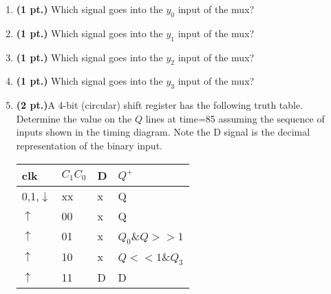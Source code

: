 \documentclass{article}
\begin{document}
\begin{enumerate}
\begin{tabular}{lr}

\begin{tabular}[!t]{l|l|l||l}
clk         & $C_1 C_0$ & D & $Q^+$ \\ \hline \hline
0,1,$\downarrow$ & xx   & x & Q     \\ \hline
$\uparrow$     & 00     & x & Q     \\  \hline
$\uparrow$     & 01     & x & 0     \\  \hline
$\uparrow$     & 10     & x & Q+1 mod 16  \\  \hline
$\uparrow$     & 11     & D & D     \\
\end{tabular}
&
\end{tabular}

\item{\bf (1 pt.)} Which signal goes into the $y_0$ input of the mux?
\item{\bf (1 pt.)} Which signal goes into the $y_1$ input of the mux?
\item{\bf (1 pt.)} Which signal goes into the $y_2$ input of the mux?
\item{\bf (1 pt.)} Which signal goes into the $y_3$ input of the mux?

\pagebreak
\item {\bf (2 pt.)}A 4-bit (circular) shift register has the 
following truth table.  Determine the value on the $Q$ lines 
at time=85 assuming the sequence of inputs shown in the 
timing diagram. Note the D signal is the decimal representation
of the binary input.

\begin{tabular}{l|l|l||l}
clk		& $C_1 C_0$	& D & $Q^+$	\\ \hline
0,1,$\downarrow$& xx		& x & Q		\\ \hline
$\uparrow$ 	& 00		& x & Q		\\  \hline
$\uparrow$ 	& 01		& x & $Q_0$\&$Q>>1$	\\  \hline
$\uparrow$ 	& 10		& x & $Q<<1$\&$Q_3$	\\  \hline
$\uparrow$ 	& 11		& D & D		\\
\end{tabular}




\end{enumerate}
\end{document}
